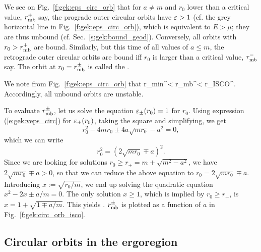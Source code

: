 We see on Fig.~\ref{f:gek:eps_circ_orb} that for $a \neq m$ and $r_0$ lower than a critical
value, $r_{\rm mb}^+$ say, the prograde outer circular orbits have $\varepsilon > 1$
(cf. the grey horizontal line in Fig.~\ref{f:gek:eps_circ_orb}), which is equivalent to
$E>\mu$; they are thus unbound (cf. Sec.~\ref{s:gek:bound_geod}). Conversely, all
orbits with $r_0 > r_{\rm mb}^+$ are bound.
Similarly, but this time of all values of $a\leq m$,
the retrograde outer circular orbits are bound iff $r_0$ is larger than
a critical value, $r_{\rm mb}^-$ say. The orbit at $r_0 = r_{\rm mb}^\pm$ is
called the .

We note from Fig.~\ref{f:gek:eps_circ_orb} that
\be
    r_{\rm min}^\pm < r_{\rm mb}^\pm < r_{\rm ISCO}^\pm .
\ee
Accordingly, all unbound orbits are unstable.

To evaluate $r_{\rm mb}^\pm$, let us solve the equation $\varepsilon_\pm(r_0) = 1$ for $r_0$.
Using expression (\ref{e:gek:veps_circ}) for $\varepsilon_\pm(r_0)$, taking the square
and simplifying, we get
\[
    r_0^2 - 4 m r_0 \pm 4 a \sqrt{m r_0} - a^2 = 0 ,
\]
which we can write
\[
    r_0^2 = (2\sqrt{mr_0} \mp a)^2  .
\]
Since we are looking for solutions $r_0 \geq r_+ = m + \sqrt{m^2 - a^2}$, we have
$2\sqrt{m r_0} \mp a > 0$, so that we can reduce the above equation to
$r_0 = 2\sqrt{m r_0} \mp a$. Introducing $x := \sqrt{r_0/m}$, we end up solving
the quadratic equation $x^2 - 2 x \pm a/m = 0$.
The only solution $x \geq 1$, which is implied by $r_0 \geq r_+$, is
$x = 1 + \sqrt{1 \mp a/m}$. This yields
\be \label{e:gek:r_mb_circ}
     .
\ee
$r_{\rm mb}^\pm$ is plotted as a function of $a$ in Fig.~\ref{f:gek:circ_orb_isco}.

\subsection{Circular orbits in the ergoregion}

